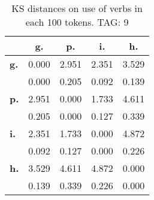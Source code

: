 \begin{table}[h!]
\begin{center}
\begin{tabular}{| l || c | c | c | c |}\hline
 & {\bf g.} & {\bf p.} & {\bf i.} & {\bf h.} \\\hline\hline
{\bf g.} & 0.000 & 2.951 & 2.351 & 3.529 \\
{\bf } & 0.000 & 0.205 & 0.092 & 0.139 \\\hline
{\bf p.} & 2.951 & 0.000 & 1.733 & 4.611 \\
{\bf } & 0.205 & 0.000 & 0.127 & 0.339 \\\hline
{\bf i.} & 2.351 & 1.733 & 0.000 & 4.872 \\
{\bf } & 0.092 & 0.127 & 0.000 & 0.226 \\\hline
{\bf h.} & 3.529 & 4.611 & 4.872 & 0.000 \\
{\bf } & 0.139 & 0.339 & 0.226 & 0.000 \\\hline
\end{tabular}
\caption{KS distances on use of verbs in each 100 tokens. TAG: 9}
\end{center}
\end{table}